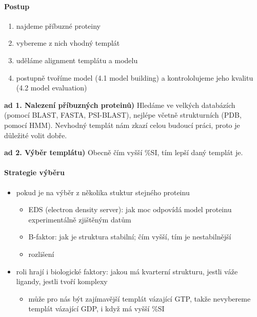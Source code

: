\documentclass[DIV=8]{scrreprt}
\begin{document}
\paragraph{Postup}
\begin{enumerate}[nosep]
    \item najdeme příbuzné proteiny
    \item vybereme z nich vhodný templát
    \item uděláme alignment templátu a modelu
    \item postupně tvoříme model (4.1 model building) a kontrololujeme jeho kvalitu (4.2 model evaluation)
\end{enumerate}



\textbf{ad 1. Nalezení příbuzných proteinů)} Hledáme ve velkých databázích (pomocí BLAST, FASTA, PSI-BLAST), nejlépe včetně strukturních (PDB, pomocí HMM). Nevhodný templát nám zkazí celou budoucí práci, proto je důležité volit dobře.

\textbf{ad 2. Výběr templátu)} Obecně čím vyšší \%SI, tím lepší daný templát je.

\paragraph{Strategie výběru}
\begin{itemize}[nosep]
    \item pokud je na výběr z několika stuktur stejného proteinu
\begin{itemize}[nosep]
    \item EDS (electron density server): jak moc odpovídá model proteinu experimentálně zjištěným datům
    \item B-faktor: jak je struktura stabilní; čím vyšší, tím je nestabilnější
    \item rozlišení
\end{itemize}

    \item roli hrají i biologické faktory: jakou má kvarterní strukturu, jestli váže ligandy, jestli tvoří komplexy
\begin{itemize}[nosep]
    \item může pro nás být zajímavější templát vázající GTP, takže nevybereme templát vázající GDP, i když má vyšší \%SI
\end{itemize}

\end{itemize}
\end{document}
